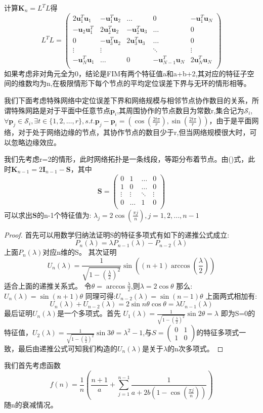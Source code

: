 \documentclass[12pt]{article}
\theoremstyle{remark}
\begin{document}
计算$\bm{K}_n=L^TL$得
\[
L^TL=\left(
\begin{array}{ccccc}
2\bm{u}^T_1\bm{u}_1&-\bm{u}_1^T\bm{u}_2&\dots&0&-\bm{u}_1^T\bm{u}_N\\
-\bm{u}_2\bm{u}_1^T&2\bm{u}_2^T\bm{u}_2&-\bm{u}_2^T\bm{u}_3&\dots&0\\
0&-\bm{u}_3^T\bm{u}_2&2\bm{u}_3^T\bm{u}_3&\dots&0\\
\vdots &\vdots&&\ddots &\vdots\\
-\bm{u}_N^T\bm{u}_1&\dots&0&-\bm{u}_{N-1}^T\bm{u}_N&2\bm{u}_N^T\bm{u}_N\\
\end{array}
\right)
\]
如果考虑非对角元全为0，结论是FIM有两个特征值a和a+b+2,其对应的特征子空间的维数均为n,在极限情形下每个节点的平均定位误差下界与无环的情形相等。

我们下面考虑特殊网络中定位误差下界和网络规模与相邻节点协作数目的关系，所谓特殊网路是对于平面中任意节点$\bm{p}_i$,其周围协作的节点数目为常数r,集合记为$\mathcal{S}_i$,$\forall \bm{p}_j \in \mathcal{S}_i,\exists t \in \{1,2,\dots,r\},s.t.\bm{p}_j-\bm{p}_i=(\cos(\frac{2t\pi}{r}),\sin(\frac{2t\pi}{r})) $，由于是平面网络，对于处于网络边缘的节点，其协作节点的数目少于r,但当网络规模很大时，可以忽略边缘效应。

我们先考虑r=2的情形，此时网络拓扑是一条线段，等距分布着节点。由($\label{eq:2S}$)式，此时$\bm{K}_{n-1}=2\bm{I}_{n-1}-\bm{S}$，其中
\[
\bm{S}=\left(
\begin{array}{cccc}
0&1&\dots&0\\
1&0&\dots&0\\
\vdots&\vdots&\ddots&\vdots\\
0&\dots&1&0\\
\end{array}\right)
\]
可以求出$\bm{S}$的n-1个特征值为:
$\lambda_j=2\cos(\frac{\pi j}{n}),j=1,2,...,n-1$
\begin{proof}
首先可以用数学归纳法证明S的特征多项式有如下的递推公式成立:
\begin{equation}
P_n(\lambda)=\lambda P_{n-1}(\lambda)-P_{n-2}(\lambda)
\end{equation}
上面$P_n(\lambda)$对应n维的S。
其次证明
\[U_n(\lambda)=\frac{1}{\sqrt{1-(\frac{\lambda}{2})^2}}\sin((n+1)\arccos(\frac{\lambda}{2}))
\]
适合上面的递推关系式。
令$\theta=\arccos\frac{\lambda}{2}$,则$\lambda=2\cos\theta$
那么:$U_n(\lambda)=\sin(n+1)\theta$
同理可得:$U_{n-2}(\lambda)=\sin(n-1)\theta$
上面两式相加有:
\[
U_n(\lambda)+U_{n-2}(\lambda)=2\sin n\theta \cos \theta=\lambda U_{n-1}(\lambda)
\]
最后证明$U_n(\lambda)$是一个多项式。首先
$U_1(\lambda)=\frac{1}{\sqrt{1-(\frac{\lambda}{2})^2}}\sin2\theta=\lambda$
即为S=0的特征值，$U_2(\lambda)=\frac{1}{\sqrt{1-(\frac{\lambda}{2})^2}}\sin3\theta=\lambda^2-1$,与$S=\left(\begin{array}{cc}0&1\\1&0\end{array}\right)$的特征多项式一致，最后由递推公式可知我们构造的$U_n(\lambda)$是关于$\lambda$的n次多项式。
\end{proof}
我们首先考虑函数
\[
f(n)=\frac{1}{n}(\frac{n+1}{a}+\sum_{j=1}^{n-1}\frac{1}{a+2b(1-\cos(\frac{\pi j}{n}))})
\]
随n的衰减情况。
\end{document}
